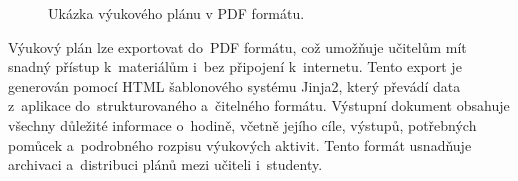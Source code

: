 \documentclass[male,czech,api_bc]{kitheses}
\begin{document}
\begin{figure}[H]
	\centering
	\caption{Ukázka výukového plánu v PDF formátu.}
	\label{fig:edubo-2}
\end{figure}

Výukový plán lze exportovat do~PDF formátu, což umožňuje učitelům mít snadný přístup k~materiálům i~bez připojení k~internetu. Tento export je generován pomocí HTML šablonového systému Jinja2, který převádí data z~aplikace do~strukturovaného a~čitelného formátu. Výstupní dokument obsahuje všechny důležité informace o~hodině, včetně jejího cíle, výstupů, potřebných pomůcek a~podrobného rozpisu výukových aktivit. Tento formát usnadňuje archivaci a~distribuci plánů mezi učiteli i~studenty.

\newpage
\end{document}
